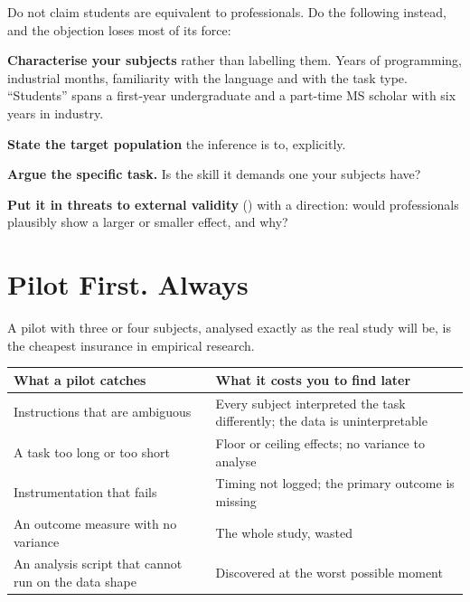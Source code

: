 \begin{conceptbox}
Do not claim students are equivalent to professionals. Do the following
instead, and the objection loses most of its force:

\begin{tightnum}
  \item \textbf{Characterise your subjects} rather than labelling them.
    Years of programming, industrial months, familiarity with the language and
    with the task type. ``Students'' spans a first-year undergraduate and a
    part-time MS scholar with six years in industry.
  \item \textbf{State the target population} the inference is to, explicitly.
  \item \textbf{Argue the specific task.} Is the skill it demands one your
    subjects have?
  \item \textbf{Put it in threats to external validity} () with
    a direction: would professionals plausibly show a larger or smaller effect,
    and why?
\end{tightnum}
\end{conceptbox}

\section{Pilot First. Always}

A pilot with three or four subjects, analysed exactly as the real study will
be, is the cheapest insurance in empirical research.

\begin{center}
\small
\begin{tabular}{@{}L{4.4cm}L{9.9cm}@{}}
\toprule
\textbf{What a pilot catches} & \textbf{What it costs you to find later} \\
\midrule
Instructions that are ambiguous & Every subject interpreted the task
                                  differently; the data is uninterpretable \\
A task too long or too short    & Floor or ceiling effects; no variance to
                                  analyse \\
Instrumentation that fails      & Timing not logged; the primary outcome is
                                  missing \\
An outcome measure with no variance & The whole study, wasted \\
An analysis script that cannot run on the data shape & Discovered at the worst
                                  possible moment \\
\bottomrule
\end{tabular}
\end{center}

